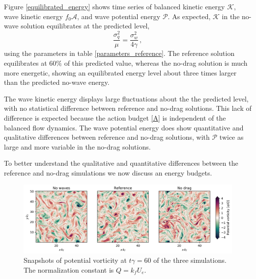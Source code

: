 \documentclass[12pt]{article}
\newcommand{\com}{\, ,}
\def\beq{\begin{equation}}
\def\eeq{\end{equation}}
\newcommand{\A}{\mathscr{A}}
\newcommand{\K}{\mathscr{K}}
\renewcommand{\P}{\mathscr{P}}
\newcommand{\?}{\stackrel{?}{=}}
\begin{document}
Figure \ref{equilibrated_energy} shows time series of balanced kinetic energy $\K$,
wave kinetic energy $f_0\A$, and wave potential energy $\P$.  As expected, $\K$ in
the no-wave solution equilibrates at the predicted level,
\beq
\frac{\sigma_q^2}{\mu} = \frac{\sigma_w^2}{4\gamma}\com
\eeq
using the parameters in table \ref{parameters_reference}. The reference solution
equilibrates at $60\%$ of this predicted value, whereas the no-drag solution is
much more energetic, showing an equilibrated energy level about three
times larger than the predicted no-wave energy.

The wave kinetic energy displays large fluctuations about the the predicted level,
with no statistical difference between reference and no-drag solutions. This lack
of difference is expected because the action budget \eqref{A} is independent of the
balanced flow dynamics. The wave potential energy does show quantitative and
qualitative differences between reference and no-drag solutions, with $\P$ twice
as large and more variable in the no-drag solutions.

To better understand the qualitative and quantitative differences between the reference
and no-drag simulations we now discuss an energy budgets.

\begin{figure}
\centering
\includegraphics[width=1.\textwidth]{figs/snapshots_pv_t_60.png}
\caption{Snapshots of potential vorticity at $t\gamma  = 60$ of the three simulations.
          The normalization constant is $Q = k_f U_e$.}
        \label{equilibrated_pv}
\end{figure}
\end{document}
